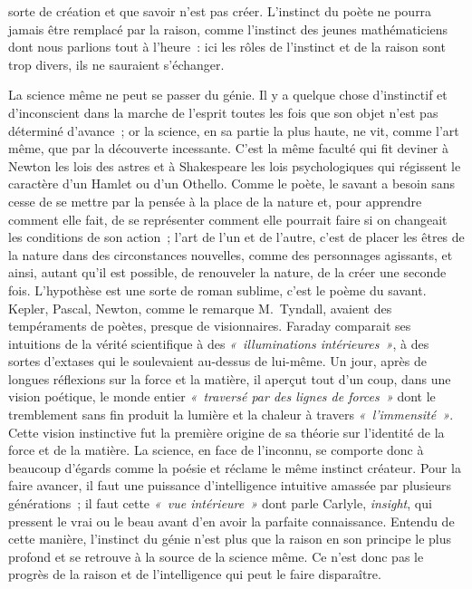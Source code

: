 \documentclass[french,twoside]{book} %
\begin{document}
sorte de création et que savoir n’est pas créer. L’instinct du poète ne pourra jamais être remplacé par la raison, comme l’instinct des jeunes mathématiciens dont nous parlions tout à l’heure : ici les rôles de l’instinct et de la raison sont trop divers, ils ne sauraient s’échanger.\par
La science même ne peut se passer du génie. Il y a quelque chose d’instinctif et d’inconscient dans la marche  de l’esprit toutes les fois que son objet n’est pas déterminé d’avance ; or la science, en sa partie la plus haute, ne vit, comme l’art même, que par la découverte incessante. C’est la même faculté qui fit deviner à Newton les lois des astres et à Shakespeare les lois psychologiques qui régissent le caractère d’un Hamlet ou d’un Othello. Comme le poète, le savant a besoin sans cesse de se mettre par la pensée à la place de la nature et, pour apprendre comment elle fait, de se représenter comment elle pourrait faire si on changeait les conditions de son action ; l’art de l’un et de l’autre, c’est de placer les êtres de la nature dans des circonstances nouvelles, comme des personnages agissants, et ainsi, autant qu’il est possible, de renouveler la nature, de la créer une seconde fois. L’hypothèse est une sorte de roman sublime, c’est le poème du savant. Kepler, Pascal, Newton, comme le remarque M. Tyndall, avaient des tempéraments de poètes, presque de visionnaires. Faraday comparait ses intuitions de la vérité scientifique à des \emph{« illuminations intérieures »}, à des sortes d’extases qui le soulevaient au-dessus de lui-même. Un jour, après de longues réflexions sur la force et la matière, il aperçut tout d’un coup, dans une vision poétique, le monde entier \emph{« traversé par des lignes de forces »} dont le tremblement sans fin produit la lumière et la chaleur à travers \emph{« l’immensité »}. Cette vision instinctive fut la première origine de sa théorie sur l’identité de la force et de la matière. La science, en face de l’inconnu, se comporte donc à beaucoup d’égards comme la poésie et réclame le même instinct créateur. Pour la faire avancer, il faut une puissance d’intelligence intuitive amassée par  plusieurs générations ; il faut cette \emph{« vue intérieure »} dont parle Carlyle, \emph{\emph{insight}}, qui pressent le vrai ou le beau avant d’en avoir la parfaite connaissance. Entendu de cette manière, l’instinct du génie n’est plus que la raison en son principe le plus profond et se retrouve à la source de la science même. Ce n’est donc pas le progrès de la raison et de l’intelligence qui peut le faire disparaître.\par
\end{document}
